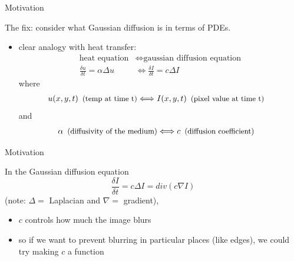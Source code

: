 \documentclass{beamer}
\begin{document}
\begin{frame}{Motivation}
    
    The fix: consider what Gaussian diffusion is in terms of PDEs. 
    \begin{itemize}
        \item clear analogy with heat transfer: 
            \begin{align*}
                \text{heat equation}&\Longleftrightarrow\text{gaussian diffusion equation}\\
                \frac{\delta u}{\delta t} = \alpha\Delta u &\Longleftrightarrow \frac{\delta I}{\delta t} = c\Delta I
            \end{align*}
        where
            \begin{align*}
                u(x,y,t)\,\,\,\small\text{(temp at time t)}&\Longleftrightarrow I(x,y,t)\,\,\,\small\text{(pixel value at time t)}
            \end{align*}
        and 
            \begin{align*}
                \alpha\,\,\,\small\text{(diffusivity of the medium)}&\Longleftrightarrow c\,\,\,\small\text{(diffusion coefficient)}
            \end{align*}
    \end{itemize}
    
\end{frame}

\begin{frame}{Motivation}
    
    In the Gaussian diffusion equation
    \begin{equation*}
        \frac{\delta I}{\delta t} = c\Delta I= div\left(c\nabla I\right)
    \end{equation*}
    (note: $\Delta=$ Laplacian and $\nabla=$ gradient),
    
    \begin{itemize}
        \item $c$ controls how much the image blurs
        \item so if we want to prevent blurring in particular places (like edges), we could try making $c$ a function
    \end{itemize}
    
\end{frame}
\end{document}
